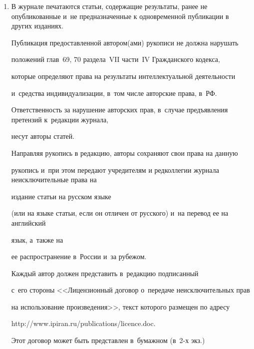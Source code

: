 {{\noindent


\begin{enumerate}[1.]


\item В журнале печатаются статьи, содержащие результаты, ранее не опубликованные и~не предназначенные к одновременной публикации в других изданиях.







Публикация предоставленной автором(ами) рукописи не должна нарушать 


положений глав~69, 70 раздела~VII части~IV Гражданского кодекса, 


которые определяют права на результаты интеллектуальной деятельности 


и~средства индивидуализации, в~том числе авторские права, в~РФ.





Ответственность за нарушение авторских прав, в~случае предъявления претензий к~редакции журнала,  


несут авторы статей.











Направляя рукопись в редакцию, авторы сохраняют свои права на данную


рукопись и~при этом передают учредителям и редколлегии журнала неисключительные права на


издание статьи на русском языке 


(или на языке статьи, если он отличен от рус\-ско\-го) и~на перевод ее на английский


язык, а~также на


ее распространение в~России и~за рубежом. 


Каждый автор должен представить в~редакцию подписанный 


с~его стороны <<Лицензионный договор о~передаче неисключительных прав 


на использование произведения>>, текст которого размещен по адресу 


{\sf http://www.ipiran.ru/publications/licence.doc}. 


Этот договор может быть пред\-став\-лен в~бумажном (в~2-х экз.)\ 



\end{enumerate}}}
